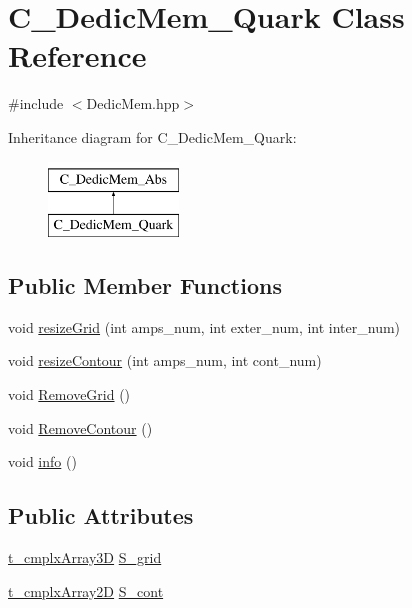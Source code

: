 \hypertarget{class_c___dedic_mem___quark}{\section{C\-\_\-\-Dedic\-Mem\-\_\-\-Quark Class Reference}
\label{class_c___dedic_mem___quark}
}


{\ttfamily \#include $<$Dedic\-Mem.\-hpp$>$}

Inheritance diagram for C\-\_\-\-Dedic\-Mem\-\_\-\-Quark\-:\begin{figure}[H]
\begin{center}
\leavevmode
\includegraphics[height=2.000000cm]{class_c___dedic_mem___quark}
\end{center}
\end{figure}
\subsection*{Public Member Functions}
\begin{DoxyCompactItemize}
\item 
void \hyperlink{class_c___dedic_mem___quark_af9870170bb87b11db976c64fa2ff87bb}{resize\-Grid} (int amps\-\_\-num, int exter\-\_\-num, int inter\-\_\-num)
\item 
void \hyperlink{class_c___dedic_mem___quark_af25f857d41fa0b568af4a11218580729}{resize\-Contour} (int amps\-\_\-num, int cont\-\_\-num)
\item 
void \hyperlink{class_c___dedic_mem___quark_a868c98c7d5930a7fd0b4314d79092581}{Remove\-Grid} ()
\item 
void \hyperlink{class_c___dedic_mem___quark_aa2c1bd42ef41a11746d8ab96dcc70e75}{Remove\-Contour} ()
\item 
void \hyperlink{class_c___dedic_mem___quark_a7252d680bbd53e5c9a183fa49117d2e3}{info} ()
\end{DoxyCompactItemize}
\subsection*{Public Attributes}
\begin{DoxyCompactItemize}
\item 
\hyperlink{types_8h_a13088102853997a3c148dfe29c372f85}{t\-\_\-cmplx\-Array3\-D} \hyperlink{class_c___dedic_mem___quark_abb615a8d4eb2c5844634ac810197ad61}{S\-\_\-grid}
\item 
\hyperlink{types_8h_a4db8c78f1689c3a957b2866daaae58f2}{t\-\_\-cmplx\-Array2\-D} \hyperlink{class_c___dedic_mem___quark_a211eb01b6fb3e276987b2a99899d18b6}{S\-\_\-cont}
\end{DoxyCompactItemize}


